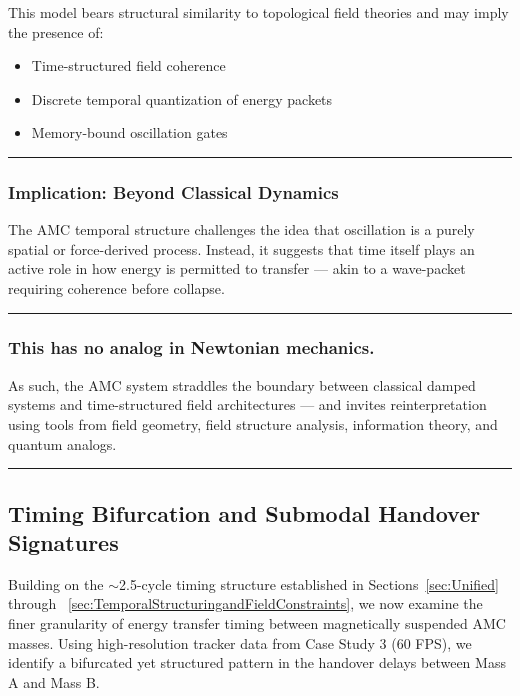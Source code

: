 \documentclass[10pt,aps,pre,onecolumn,superscriptaddress,notitlepage]{revtex4-2}
\begin{document}
This model bears structural similarity to topological field theories and may imply the presence of:

\begin{itemize}
    \item Time-structured field coherence
\item Discrete temporal quantization of energy packets
\item Memory-bound oscillation gates

\end{itemize}
\vspace{1em}
\hrule
\vspace{0.2em}

\subsubsection{Implication: Beyond Classical Dynamics}
The AMC temporal structure challenges the idea that oscillation is a purely spatial or force-derived process. Instead, it suggests that time itself plays an active role in how energy is permitted to transfer — akin to a wave-packet requiring coherence before collapse. 

\vspace{1em}
\hrule
\vspace{0.2em}
\subsubsection{This has no analog in Newtonian mechanics.}
As such, the AMC system straddles the boundary between classical damped systems and time-structured field architectures — and invites reinterpretation using tools from field geometry, field structure analysis, information theory, and quantum analogs.

\vspace{1em}
\hrule
\vspace{0.2em}


\subsection{Timing Bifurcation and Submodal Handover Signatures}
\label{sec:TimingBifurcation}
Building on the $\sim$2.5-cycle timing structure established in Sections~\ref{sec:Unified} through ~\ref{sec:TemporalStructuringandFieldConstraints}, we now examine the finer granularity of energy transfer timing between magnetically suspended AMC masses. Using high-resolution tracker data from Case Study 3 (60 FPS), we identify a bifurcated yet structured pattern in the handover delays between Mass A and Mass B.
\end{document}
